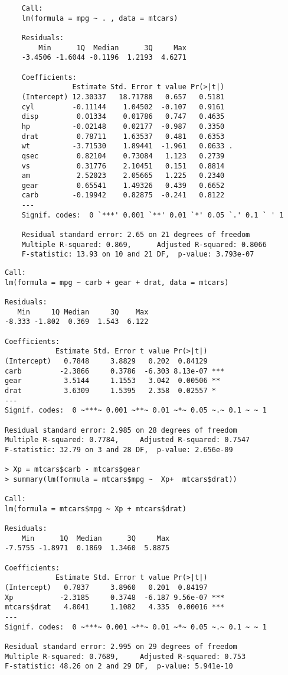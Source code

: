 \documentclass[12pt]{article}
\begin{document}
	\begin{verbatim}
	Call:
	lm(formula = mpg ~ . , data = mtcars)
	
	Residuals:
	    Min      1Q  Median      3Q     Max 
	-3.4506 -1.6044 -0.1196  1.2193  4.6271 
	
	Coefficients:
	            Estimate Std. Error t value Pr(>|t|)  
	(Intercept) 12.30337   18.71788   0.657   0.5181  
	cyl         -0.11144    1.04502  -0.107   0.9161  
	disp         0.01334    0.01786   0.747   0.4635  
	hp          -0.02148    0.02177  -0.987   0.3350  
	drat         0.78711    1.63537   0.481   0.6353  
	wt          -3.71530    1.89441  -1.961   0.0633 .
	qsec         0.82104    0.73084   1.123   0.2739  
	vs           0.31776    2.10451   0.151   0.8814  
	am           2.52023    2.05665   1.225   0.2340  
	gear         0.65541    1.49326   0.439   0.6652  
	carb        -0.19942    0.82875  -0.241   0.8122  
	---
	Signif. codes:  0 `***' 0.001 `**' 0.01 `*' 0.05 `.' 0.1 ` ' 1 
	
	Residual standard error: 2.65 on 21 degrees of freedom
	Multiple R-squared: 0.869,      Adjusted R-squared: 0.8066 
	F-statistic: 13.93 on 10 and 21 DF,  p-value: 3.793e-07 
	\end{verbatim}
	
\begin{verbatim}
Call:
lm(formula = mpg ~ carb + gear + drat, data = mtcars)

Residuals:
   Min     1Q Median     3Q    Max 
-8.333 -1.802  0.369  1.543  6.122 

Coefficients:
            Estimate Std. Error t value Pr(>|t|)    
(Intercept)   0.7848     3.8829   0.202  0.84129    
carb         -2.3866     0.3786  -6.303 8.13e-07 ***
gear          3.5144     1.1553   3.042  0.00506 ** 
drat          3.6309     1.5395   2.358  0.02557 *  
---
Signif. codes:  0 ~***~ 0.001 ~**~ 0.01 ~*~ 0.05 ~.~ 0.1 ~ ~ 1 

Residual standard error: 2.985 on 28 degrees of freedom
Multiple R-squared: 0.7784,     Adjusted R-squared: 0.7547 
F-statistic: 32.79 on 3 and 28 DF,  p-value: 2.656e-09 

> Xp = mtcars$carb - mtcars$gear
> summary(lm(formula = mtcars$mpg ~  Xp+  mtcars$drat))

Call:
lm(formula = mtcars$mpg ~ Xp + mtcars$drat)

Residuals:
    Min      1Q  Median      3Q     Max 
-7.5755 -1.8971  0.1869  1.3460  5.8875 

Coefficients:
            Estimate Std. Error t value Pr(>|t|)    
(Intercept)   0.7837     3.8960   0.201  0.84197    
Xp           -2.3185     0.3748  -6.187 9.56e-07 ***
mtcars$drat   4.8041     1.1082   4.335  0.00016 ***
---
Signif. codes:  0 ~***~ 0.001 ~**~ 0.01 ~*~ 0.05 ~.~ 0.1 ~ ~ 1 

Residual standard error: 2.995 on 29 degrees of freedom
Multiple R-squared: 0.7689,     Adjusted R-squared: 0.753 
F-statistic: 48.26 on 2 and 29 DF,  p-value: 5.941e-10 
\end{verbatim}
\end{document}
